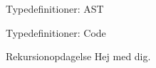 \begin{frame}{Typedefinitioner: AST}
  
\end{frame}

\begin{frame}{Typedefinitioner: Code}
  \fontsize{7pt}{7.2}\selectfont

\end{frame}

\begin{frame}{Rekursionopdagelse}
  Hej med dig.
  
\end{frame}

